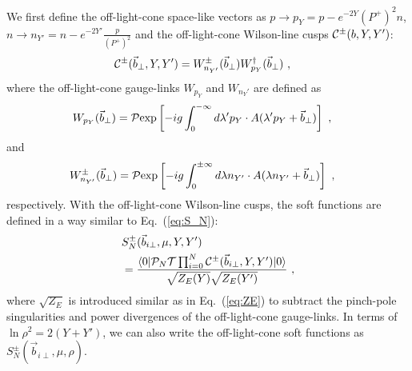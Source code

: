 \documentclass[twocolumn,superscriptaddress,longbibliography,10pt]{revtex4-1}
\begin{document}
We first  define the off-light-cone space-like vectors as $p\rightarrow p_Y= p-e^{-2Y}(P^+)^2n $, $n \rightarrow n_{Y'}=n-e^{-2Y'}\frac{p}{(P^+)^2}$ and the off-light-cone Wilson-line cusps ${\cal C}^{\pm}(b,Y,Y')$:
\begin{align}
&{\cal C}^{\pm}(\vec{b}_\perp,Y,Y')=W^{\pm}_{n_{Y'}}(\vec{b}_\perp)W^{\dagger}_{p_Y}(\vec{b}_\perp) \ ,
\end{align}
where the off-light-cone gauge-links $W_{p_Y}$ and $W_{n_Y'}$ are defined as
\begin{align}
&W_{p_Y}(\vec{b}_\perp)={\cal P}{\rm exp}\left[-ig\int_{0}^{-\infty} d\lambda' p_Y \cdot A(\lambda' p_Y+\vec{b}_\perp)\right] \ ,
\end{align}
and
\begin{align}
&W_{n_{Y'}}^{\pm}(\vec{b}_\perp)={\cal P}{\rm exp}\left[-ig\int_{0}^{\pm \infty} d\lambda  n_{Y'}\cdot A(\lambda n_{Y'}+\vec{b}_\perp)\right]  \ ,
\end{align}
respectively. With the off-light-cone Wilson-line cusps, the soft functions are defined in a way similar to Eq.~(\ref{eq:S_N}):
\begin{align}\label{eq:SNoff}
     &S^{\pm}_N(\vec{b}_{i\perp},\mu,Y,Y')\nonumber \\
     &= \frac{\langle 0|{\cal P}_N{\cal T}\prod_{i=0}^{N}{\cal C}^{\pm}(\vec{b}_{i\perp},Y,Y')|0\rangle}{\sqrt{Z_E(Y)}\sqrt{Z_E(Y')}}  \ ,
\end{align}
where $\sqrt{Z_E}$ is introduced similar as in Eq.~(\ref{eq:ZE}) to subtract the pinch-pole singularities and power divergences of the off-light-cone gauge-links. In terms of $\ln \rho^2=2(Y+Y')$, we can also write the off-light-cone soft functions as $S^{\pm}_N(\vec{b}_{i\perp},\mu,\rho)$.
\end{document}
